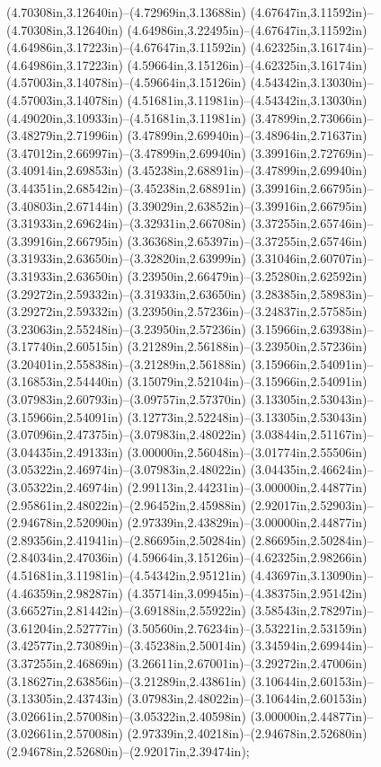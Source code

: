 (4.70308in,3.12640in)--(4.72969in,3.13688in) (4.67647in,3.11592in)--(4.70308in,3.12640in) (4.64986in,3.22495in)--(4.67647in,3.11592in) (4.64986in,3.17223in)--(4.67647in,3.11592in) (4.62325in,3.16174in)--(4.64986in,3.17223in) (4.59664in,3.15126in)--(4.62325in,3.16174in) (4.57003in,3.14078in)--(4.59664in,3.15126in) (4.54342in,3.13030in)--(4.57003in,3.14078in) (4.51681in,3.11981in)--(4.54342in,3.13030in) (4.49020in,3.10933in)--(4.51681in,3.11981in) (3.47899in,2.73066in)--(3.48279in,2.71996in) (3.47899in,2.69940in)--(3.48964in,2.71637in) (3.47012in,2.66997in)--(3.47899in,2.69940in) (3.39916in,2.72769in)--(3.40914in,2.69853in) (3.45238in,2.68891in)--(3.47899in,2.69940in) (3.44351in,2.68542in)--(3.45238in,2.68891in) (3.39916in,2.66795in)--(3.40803in,2.67144in) (3.39029in,2.63852in)--(3.39916in,2.66795in) (3.31933in,2.69624in)--(3.32931in,2.66708in) (3.37255in,2.65746in)--(3.39916in,2.66795in) (3.36368in,2.65397in)--(3.37255in,2.65746in) (3.31933in,2.63650in)--(3.32820in,2.63999in) (3.31046in,2.60707in)--(3.31933in,2.63650in) (3.23950in,2.66479in)--(3.25280in,2.62592in) (3.29272in,2.59332in)--(3.31933in,2.63650in) (3.28385in,2.58983in)--(3.29272in,2.59332in) (3.23950in,2.57236in)--(3.24837in,2.57585in) (3.23063in,2.55248in)--(3.23950in,2.57236in) (3.15966in,2.63938in)--(3.17740in,2.60515in) (3.21289in,2.56188in)--(3.23950in,2.57236in) (3.20401in,2.55838in)--(3.21289in,2.56188in) (3.15966in,2.54091in)--(3.16853in,2.54440in) (3.15079in,2.52104in)--(3.15966in,2.54091in) (3.07983in,2.60793in)--(3.09757in,2.57370in) (3.13305in,2.53043in)--(3.15966in,2.54091in) (3.12773in,2.52248in)--(3.13305in,2.53043in) (3.07096in,2.47375in)--(3.07983in,2.48022in) (3.03844in,2.51167in)--(3.04435in,2.49133in) (3.00000in,2.56048in)--(3.01774in,2.55506in) (3.05322in,2.46974in)--(3.07983in,2.48022in) (3.04435in,2.46624in)--(3.05322in,2.46974in) (2.99113in,2.44231in)--(3.00000in,2.44877in) (2.95861in,2.48022in)--(2.96452in,2.45988in) (2.92017in,2.52903in)--(2.94678in,2.52090in) (2.97339in,2.43829in)--(3.00000in,2.44877in) (2.89356in,2.41941in)--(2.86695in,2.50284in) (2.86695in,2.50284in)--(2.84034in,2.47036in) (4.59664in,3.15126in)--(4.62325in,2.98266in) (4.51681in,3.11981in)--(4.54342in,2.95121in) (4.43697in,3.13090in)--(4.46359in,2.98287in) (4.35714in,3.09945in)--(4.38375in,2.95142in) (3.66527in,2.81442in)--(3.69188in,2.55922in) (3.58543in,2.78297in)--(3.61204in,2.52777in) (3.50560in,2.76234in)--(3.53221in,2.53159in) (3.42577in,2.73089in)--(3.45238in,2.50014in) (3.34594in,2.69944in)--(3.37255in,2.46869in) (3.26611in,2.67001in)--(3.29272in,2.47006in) (3.18627in,2.63856in)--(3.21289in,2.43861in) (3.10644in,2.60153in)--(3.13305in,2.43743in) (3.07983in,2.48022in)--(3.10644in,2.60153in) (3.02661in,2.57008in)--(3.05322in,2.40598in) (3.00000in,2.44877in)--(3.02661in,2.57008in) (2.97339in,2.40218in)--(2.94678in,2.52680in) (2.94678in,2.52680in)--(2.92017in,2.39474in);
